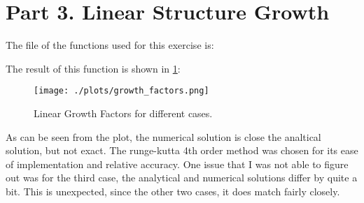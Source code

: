 \section{Part 3. Linear Structure Growth}

The file of the functions used for this exercise is:



The result of this function is shown in \ref{fig:lgf}:

\begin{figure}[h!]
  \centering
  \texttt{[image: ./plots/growth\_factors.png]}
  \caption{Linear Growth Factors for different cases.}
  \label{fig:lgf}
\end{figure}

As can be seen from the plot, the numerical solution is close the analtical solution, but not exact.
The runge-kutta 4th order method was chosen for its ease of implementation and relative accuracy.
One issue that I was not able to figure out was for the third case, the analytical and numerical solutions differ by
quite a bit. This is unexpected, since the other two cases, it does match fairly closely.